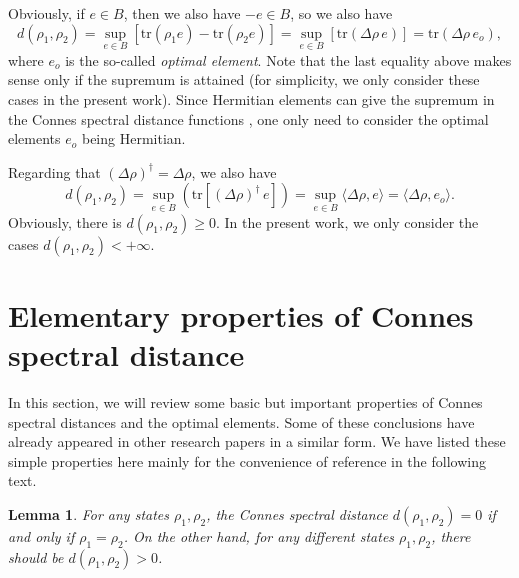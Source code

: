 \documentclass[a4paper,12pt]{article}
\newtheorem{lemma}{Lemma}
\begin{document}
Obviously, if $e \in B$, then we also have $- e \in B$, so we also have
\begin{equation}
  d (\rho_1, \rho_2) = \sup_{e \in B} [\mathrm{tr} (\rho_1 e) - \mathrm{tr}
  (\rho_2 e)] = \sup_{e \in B} [\mathrm{tr} (\Delta \rho \, e)] =
  \mathrm{tr} (\Delta \rho \, e_o),
\end{equation}
where $e_o$ is the so-called \textit{optimal element}.
Note that the last equality above makes sense only if the supremum is attained (for simplicity, we only consider these cases in the present work).
Since
Hermitian elements can give the supremum in the Connes spectral distance
functions \cite{Iochum}, one only need to consider the optimal elements
$e_o$ being Hermitian.

Regarding that $(\Delta \rho)^{\dag} = \Delta \rho$, we also have
\begin{equation}
  d (\rho_1, \rho_2) = \sup_{e \in B} (\mathrm{tr} [(\Delta \rho)^{\dag} 
  \, e]) = \sup_{e \in B} \langle \Delta \rho, e \rangle =
  \langle \Delta \rho, e_o \rangle .
\end{equation}
Obviously, there is $d (\rho_1, \rho_2) \geqslant 0$. In the present work, we
only consider the cases $d (\rho_1, \rho_2) < + \infty$. 




\section{Elementary properties of Connes spectral distance}\label{sec3}
In this section, we will review some basic but important properties of Connes spectral distances and the optimal elements. Some of these conclusions have already appeared in other research papers in a similar form. We have listed these simple properties here mainly for the convenience of reference in the following text.
\begin{lemma}\label{d0}\cite{Martinettif}
  For any states $\rho_1, \rho_2$, the Connes spectral distance $d (\rho_1,
  \rho_2) = 0$ if and only if $\rho_1 = \rho_2$. On the other hand, for any
  different states $\rho_1, \rho_2$, there should be $d (\rho_1, \rho_2) > 0$.
\end{lemma}
\end{document}
